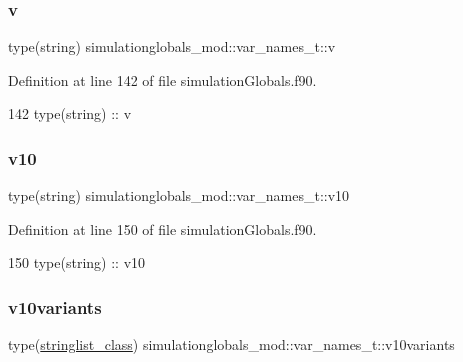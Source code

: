 \subsubsection{\texorpdfstring{v}{v}}
{\footnotesize\ttfamily type(string) simulationglobals\+\_\+mod\+::var\+\_\+names\+\_\+t\+::v\hspace{0.3cm}{\ttfamily [private]}}



Definition at line 142 of file simulation\+Globals.\+f90.


\begin{DoxyCode}
142         \textcolor{keywordtype}{type}(string) :: v
\end{DoxyCode}
\mbox{\label{structsimulationglobals__mod_1_1var__names__t_a4dda010a72c58b6885c6b142a77d5d60}} 
\subsubsection{\texorpdfstring{v10}{v10}}
{\footnotesize\ttfamily type(string) simulationglobals\+\_\+mod\+::var\+\_\+names\+\_\+t\+::v10\hspace{0.3cm}{\ttfamily [private]}}



Definition at line 150 of file simulation\+Globals.\+f90.


\begin{DoxyCode}
150         \textcolor{keywordtype}{type}(string) :: v10
\end{DoxyCode}
\mbox{\label{structsimulationglobals__mod_1_1var__names__t_a5db5107c83d136071d3c442ac6780a2b}} 
\subsubsection{\texorpdfstring{v10variants}{v10variants}}
{\footnotesize\ttfamily type(\mbox{\hyperlink{structsimulationglobals__mod_1_1stringlist__class}{stringlist\+\_\+class}}) simulationglobals\+\_\+mod\+::var\+\_\+names\+\_\+t\+::v10variants\hspace{0.3cm}{\ttfamily [private]}}



